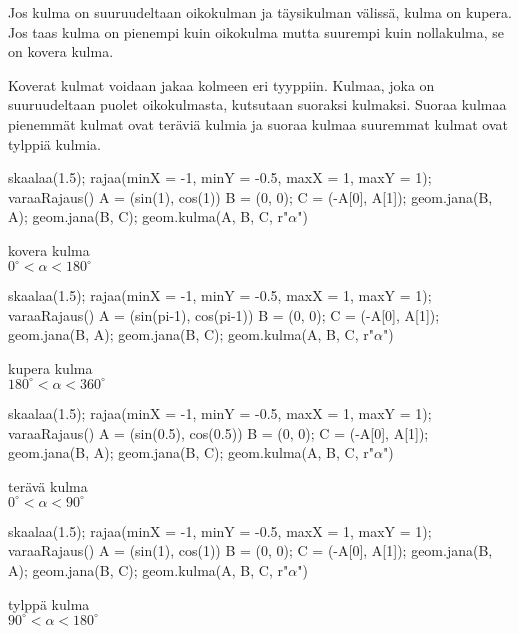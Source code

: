 
Jos kulma on
suuruudeltaan oikokulman ja täysikulman välissä, kulma on kupera. Jos taas kulma on pienempi
kuin oikokulma mutta suurempi kuin nollakulma, se on kovera kulma.

Koverat kulmat voidaan jakaa kolmeen eri tyyppiin. Kulmaa, joka on suuruudeltaan puolet
oikokulmasta, kutsutaan suoraksi kulmaksi. Suoraa kulmaa pienemmät kulmat ovat teräviä
kulmia ja suoraa kulmaa suuremmat kulmat ovat tylppiä kulmia.

\begin{minipage}{3cm}
\begin{kuva}
skaalaa(1.5); rajaa(minX = -1, minY = -0.5, maxX = 1, maxY = 1); varaaRajaus()
A = (sin(1), cos(1))
B = (0, 0); C = (-A[0], A[1]); geom.jana(B, A); geom.jana(B, C); geom.kulma(A, B, C, r"$\alpha$")
\end{kuva}
\centering kovera kulma \\$0^\circ < \alpha < 180^\circ$
\end{minipage}
\begin{minipage}{3cm}
\begin{kuva}
skaalaa(1.5); rajaa(minX = -1, minY = -0.5, maxX = 1, maxY = 1); varaaRajaus()
A = (sin(pi-1), cos(pi-1))
B = (0, 0); C = (-A[0], A[1]); geom.jana(B, A); geom.jana(B, C); geom.kulma(A, B, C, r"$\alpha$")
\end{kuva}
\centering kupera kulma \\$180^\circ < \alpha < 360^\circ$
\end{minipage}
\begin{minipage}{3cm}
\begin{kuva}
skaalaa(1.5); rajaa(minX = -1, minY = -0.5, maxX = 1, maxY = 1); varaaRajaus()
A = (sin(0.5), cos(0.5))
B = (0, 0); C = (-A[0], A[1]); geom.jana(B, A); geom.jana(B, C); geom.kulma(A, B, C, r"$\alpha$")
\end{kuva}
\centering terävä kulma \\$0^\circ < \alpha < 90^\circ$
\end{minipage}
\begin{minipage}{3cm}
\begin{kuva}
skaalaa(1.5); rajaa(minX = -1, minY = -0.5, maxX = 1, maxY = 1); varaaRajaus()
A = (sin(1), cos(1))
B = (0, 0); C = (-A[0], A[1]); geom.jana(B, A); geom.jana(B, C); geom.kulma(A, B, C, r"$\alpha$")
\end{kuva}
\centering tylppä kulma \\$90^\circ < \alpha < 180^\circ$
\end{minipage}


